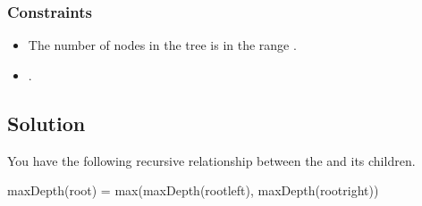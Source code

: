 \documentclass[letterpaper,12pt,english]{book}
\begin{document}
\subsubsection{Constraints}
\label{\detokenize{Binary_Tree/104_Maximum_Depth_of_Binary_Tree:constraints}}\begin{itemize}
\item {} 
\sphinxAtStartPar
The number of nodes in the tree is in the range \sphinxcode{\sphinxupquote{{[}0, 10\textasciicircum{}4{]}}}.

\item {} 
\sphinxAtStartPar
{}.

\end{itemize}


\subsection{Solution}
\label{\detokenize{Binary_Tree/104_Maximum_Depth_of_Binary_Tree:solution}}
\sphinxAtStartPar
You have the following recursive relationship between the  and its children.

\begin{sphinxVerbatim}[commandchars=\\\{\}]
maxDepth(root) = max(maxDepth(root\PYGZhy{}\PYGZgt{}left), maxDepth(root\PYGZhy{}\PYGZgt{}right))
\end{sphinxVerbatim}
\end{document}
